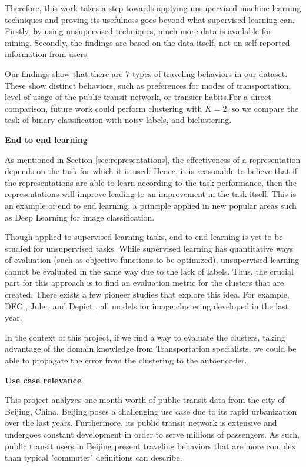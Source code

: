 \documentclass{article}
\begin{document}
Therefore, this work takes a step towards applying unsupervised machine learning techniques and proving its usefulness goes beyond what supervised learning can. Firstly, by using unsupervised techniques, much more data is available for mining. Secondly, the findings are based on the data itself, not on self reported information from users. 

Our findings show that there are 7 types of traveling behaviors in our dataset. These show distinct behaviors, such as preferences for modes of transportation, level of usage of the public transit network, or transfer habits.For a direct comparison, future work could perform clustering with $K = 2$, so we compare the task of binary classification with noisy labels, and biclustering.

\textbf{End to end learning}


As mentioned in Section \ref{sec:representations}, the effectiveness of a representation depends on the task for which it is used. Hence, it is reasonable to believe that if the representations are able to learn according to the task performance, then the representations will improve leading to an improvement in the task itself. This is an example of end to end learning, a principle applied in new popular areas such as Deep Learning for image classification.

Though applied to supervised learning tasks, end to end learning is yet to be studied for unsupervised tasks. While supervised learning has quantitative ways of evaluation (such as objective functions to be optimized), unsupervised learning cannot be evaluated in the same way due to the lack of labels. Thus, the crucial part for this approach is to find an evaluation metric for the clusters that are created. There exists a few pioneer studies that explore this idea. For example, DEC \cite{xie2016unsupervised}, Jule \cite{yang2016joint}, and Depict \cite{dizaji2017deep}, all models for image clustering developed in the last year. 

In the context of this project, if we find a way to evaluate the clusters, taking advantage of the domain knowledge from Transportation specialists, we could be able to propagate the error from the clustering to the autoencoder. 
 
\textbf{Use case relevance}

This project analyzes one month worth of public transit data from the city of Beijing, China. Beijing poses a challenging use case due to its rapid urbanization over the last years. Furthermore, its public transit network is extensive and undergoes constant development in order to serve millions of passengers. As such, public transit users in Beijing present traveling behaviors that are more complex than typical "commuter" definitions can describe. 
\end{document}
